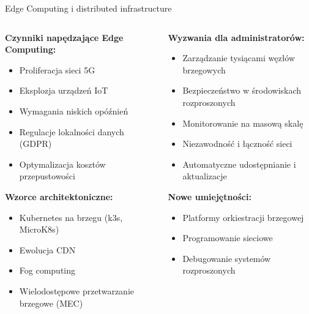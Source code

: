 \documentclass[10pt, aspectratio=169]{beamer}
\begin{document}
\begin{frame}{Edge Computing i distributed infrastructure}
\begin{columns}[T]
\begin{column}{0.5\textwidth}
\textbf{Czynniki napędzające Edge Computing:}
\begin{itemize}
\item Proliferacja sieci 5G
\item Eksplozja urządzeń IoT
\item Wymagania niskich opóźnień
\item Regulacje lokalności danych (GDPR)
\item Optymalizacja kosztów przepustowości
\end{itemize}

\textbf{Wzorce architektoniczne:}
\begin{itemize}
\item Kubernetes na brzegu (k3s, MicroK8s)
\item Ewolucja CDN
\item Fog computing
\item Wielodostępowe przetwarzanie brzegowe (MEC)
\end{itemize}
\end{column}
\begin{column}{0.5\textwidth}
\textbf{Wyzwania dla administratorów:}
\begin{itemize}
\item Zarządzanie tysiącami węzłów brzegowych
\item Bezpieczeństwo w środowiskach rozproszonych
\item Monitorowanie na masową skalę
\item Niezawodność i łączność sieci
\item Automatyczne udostępnianie i aktualizacje
\end{itemize}

\textbf{Nowe umiejętności:}
\begin{itemize}
\item Platformy orkiestracji brzegowej
\item Programowanie sieciowe
\item Debugowanie systemów rozproszonych
\end{itemize}
\end{column}
\end{columns}
\end{frame}
\end{document}
